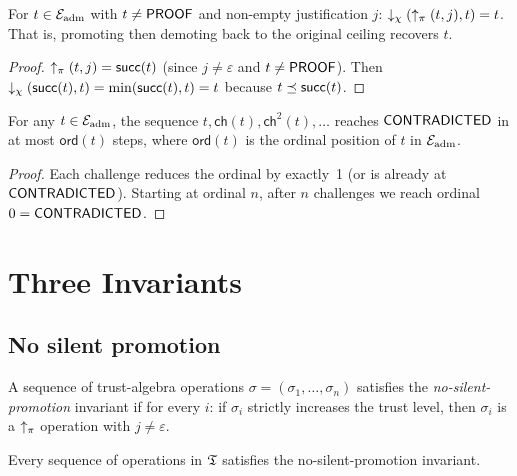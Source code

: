 \documentclass[11pt]{article}
\begin{document}
\begin{lemma}\label{lem:promo-demo}
For $t \in \mathcal{E}_{\mathrm{adm}}$ with $t \neq \mathsf{PROOF}$ and non-empty
justification $j$:
$\downarrow_\chi(\uparrow_\pi(t, j), t) = t$.
That is, promoting then demoting back to the original ceiling
recovers $t$.
\end{lemma}

\begin{proof}
$\uparrow_\pi(t, j) = \mathsf{succ}(t)$ (since $j \neq \varepsilon$
and $t \neq \mathsf{PROOF}$).  Then $\downarrow_\chi(\mathsf{succ}(t), t)
= \min(\mathsf{succ}(t), t) = t$ because $t \preceq \mathsf{succ}(t)$.
\end{proof}

\begin{lemma}\label{lem:challenge-convergence}
For any $t \in \mathcal{E}_{\mathrm{adm}}$, the sequence $t, \mathsf{ch}(t),
\mathsf{ch}^2(t), \ldots$ reaches $\mathsf{CONTRADICTED}$ in at most
$\mathsf{ord}(t)$ steps, where $\mathsf{ord}(t)$ is the
ordinal position of $t$ in $\mathcal{E}_{\mathrm{adm}}$.
\end{lemma}

\begin{proof}
Each challenge reduces the ordinal by exactly~1 (or is
already at $\mathsf{CONTRADICTED}$).  Starting at ordinal $n$,
after $n$ challenges we reach ordinal $0 = \mathsf{CONTRADICTED}$.
\end{proof}


\section{Three Invariants}\label{sec:invariants}

\subsection{No silent promotion}\label{sec:inv-silent}

\begin{definition}\label{def:nsp}
A sequence of trust-algebra operations
$\sigma = (\sigma_1, \ldots, \sigma_n)$ satisfies the
\emph{no-silent-promotion} invariant if for every $i$:
if $\sigma_i$ strictly increases the trust level, then
$\sigma_i$ is a $\uparrow_\pi$ operation with $j \neq \varepsilon$.
\end{definition}

\begin{theorem}\label{thm:nsp}
Every sequence of operations in $\mathfrak{T}$ satisfies the
no-silent-promotion invariant.
\end{theorem}
\end{document}
